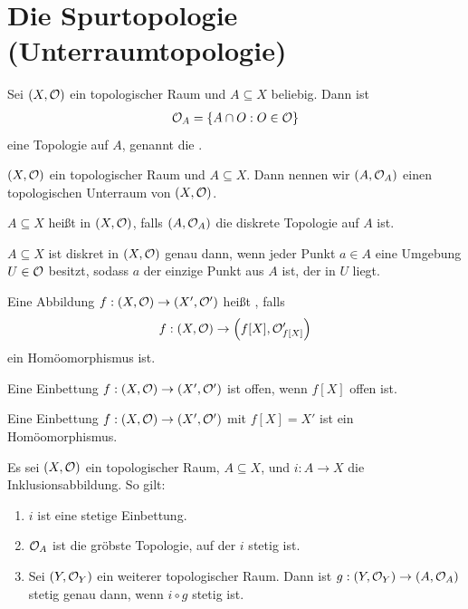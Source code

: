 \documentclass{report}
\begin{document}
\section{Die Spurtopologie (Unterraumtopologie)}
\begin{theorem}
	Sei $(X, \mathcal{O})$ ein topologischer Raum und $A \subseteq X$ beliebig. Dann ist
	\begin{align*}
		\mathcal{O}_A = \qty{A \cap O : O \in \mathcal{O}}
	\end{align*}
	eine Topologie auf $A$, genannt die .
\end{theorem}
\begin{definition}
	$(X, \mathcal{O})$ ein topologischer Raum und $A \subseteq X$. Dann nennen wir $(A, \mathcal{O}_A)$ einen topologischen Unterraum von $(X, \mathcal{O})$.
\end{definition}
\begin{definition}
	$A \subseteq X$ heißt  in $(X, \mathcal{O})$, falls $(A, \mathcal{O}_A)$ die diskrete Topologie auf $A$ ist.
\end{definition}
\begin{theorem}
	$A \subseteq X$ ist diskret in $(X, \mathcal{O})$ genau dann, wenn jeder Punkt $a \in A$ eine Umgebung $U \in \mathcal{O}$ besitzt, sodass $a$ der einzige Punkt aus $A$ ist, der in $U$ liegt.
\end{theorem}
\begin{definition}
	Eine Abbildung $f: (X, \mathcal{O}) \to (X', \mathcal{O}')$ heißt , falls
	\begin{align*}
		f : (X, \mathcal{O}) \to \qty(f[X], \mathcal{O}'_{f[X]})
	\end{align*}
	ein Homöomorphismus ist.
\end{definition}
\begin{lemma}
	Eine Einbettung $f: (X, \mathcal{O}) \to (X', \mathcal{O}')$ ist offen, wenn $f[X]$ offen ist.
\end{lemma}
\begin{lemma}
	Eine Einbettung $f: (X, \mathcal{O}) \to (X', \mathcal{O}')$ mit $f[X] = X'$ ist ein Homöomorphismus.
\end{lemma}
\begin{theorem}
	Es sei $(X, \mathcal{O})$ ein topologischer Raum, $A \subseteq X$, und $i : A \to X$ die Inklusionsabbildung. So gilt:
	\begin{enumerate}
		\item $i$ ist eine stetige Einbettung.
		\item $\mathcal{O}_A$ ist die gröbste Topologie, auf der $i$ stetig ist.
		\item Sei $(Y, \mathcal{O}_Y)$ ein weiterer topologischer Raum. Dann ist $g : (Y, \mathcal{O}_Y) \to (A, \mathcal{O}_A)$ stetig genau dann, wenn $i \circ g$ stetig ist.
	\end{enumerate}
\end{theorem}
\end{document}
